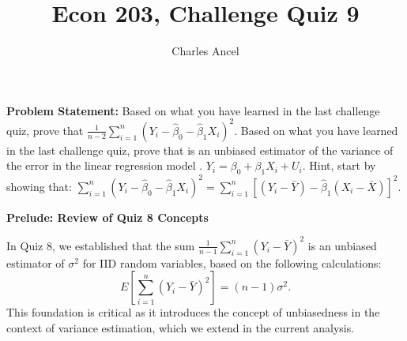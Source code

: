 \documentclass[12pt]{amsart}
\title{Econ 203, Challenge Quiz 9}
\author{Charles Ancel}
\theoremstyle{definition}
\numberwithin{equation}{section}
\theoremstyle{plain}
\begin{document}
\maketitle

\textbf{Problem Statement:} Based on what you have learned in the last challenge quiz, prove that \(\frac{1}{n-2}\sum_{i=1}^n(Y_i-\widehat{\beta}_0 - \widehat{\beta}_1X_i)^2\).
Based on what you have learned in the last challenge quiz, prove that is an unbiased estimator of the variance of the error in the linear regression model .
\(Y_i=\beta_0+\beta_1X_i+U_i.\)
Hint, start by showing that: \(\sum_{i=1}^n(Y_i-\widehat\beta_0-\widehat\beta_1X_i)^2=\sum_{i=1}^n\left[(Y_i-\bar{Y}) -\widehat{\beta}_1(X_i-\bar{X})\right]^2\).


\textbf{\large Prelude: Review of Quiz 8 Concepts}

In Quiz 8, we established that the sum 
\(\frac{1}{n-1}\sum_{i=1}^n (Y_i - \bar{Y})^2\)
is an unbiased estimator of \(\sigma^2\) for IID random variables, based on the following calculations:
\[E\left[\sum_{i=1}^n (Y_i - \bar{Y})^2\right] = (n-1)\sigma^2.\]
This foundation is critical as it introduces the concept of unbiasedness in the context of variance estimation, which we extend in the current analysis.
\end{document}
